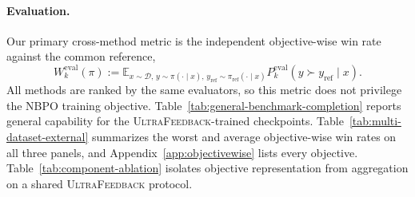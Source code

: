 \documentclass{article}
\theoremstyle{remark}
\theoremstyle{plain}
\newcommand{\E}{\mathbb{E}}
\newcommand{\D}{\mathcal{D}}
\newcommand{\piref}{\pi_{\mathrm{ref}}}
\newcommand{\NBPO}{\textsc{NBPO}}
\begin{document}
\paragraph{Evaluation.}
Our primary cross-method metric is the independent objective-wise win rate against the common reference,
\begin{equation}
W_k^{\mathrm{eval}}(\pi)
:=
\E_{x\sim\D,\,y\sim\pi(\cdot\mid x),\,y_{\mathrm{ref}}\sim\piref(\cdot\mid x)}
P_k^{\mathrm{eval}}(y\succ y_{\mathrm{ref}}\mid x).
\label{eq:external-win-rate}
\end{equation}
All methods are ranked by the same evaluators, so this metric does not privilege the \NBPO{} training objective. Table~\ref{tab:general-benchmark-completion} reports general capability for the \textsc{UltraFeedback}-trained checkpoints. Table~\ref{tab:multi-dataset-external} summarizes the worst and average objective-wise win rates on all three panels, and Appendix~\ref{app:objectivewise} lists every objective. Table~\ref{tab:component-ablation} isolates objective representation from aggregation on a shared \textsc{UltraFeedback} protocol.
\end{document}
